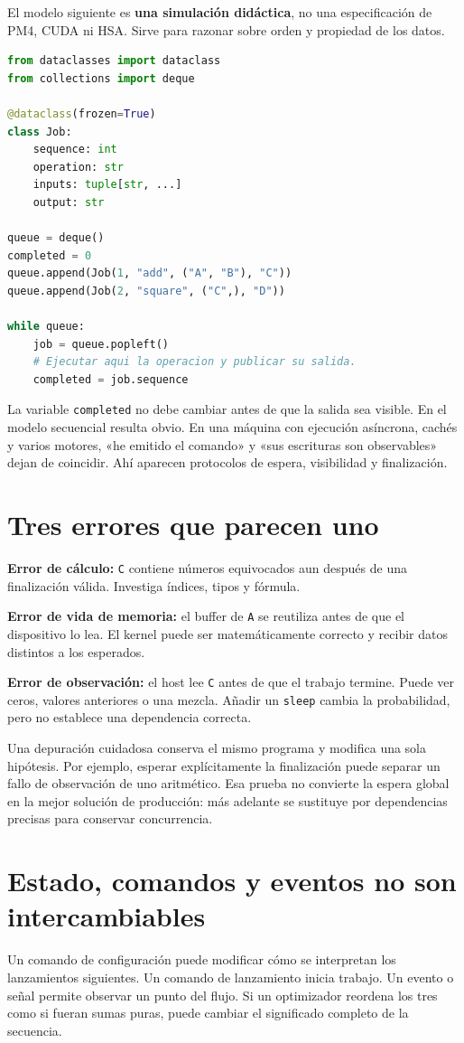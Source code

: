 \documentclass[12pt,a4paper,oneside]{report}
\begin{document}
El modelo siguiente es \textbf{una simulación didáctica}, no una especificación de PM4, CUDA ni HSA. Sirve para razonar sobre orden y propiedad de los datos.

\begin{lstlisting}[language=Python]
from dataclasses import dataclass
from collections import deque

@dataclass(frozen=True)
class Job:
    sequence: int
    operation: str
    inputs: tuple[str, ...]
    output: str

queue = deque()
completed = 0
queue.append(Job(1, "add", ("A", "B"), "C"))
queue.append(Job(2, "square", ("C",), "D"))

while queue:
    job = queue.popleft()
    # Ejecutar aqui la operacion y publicar su salida.
    completed = job.sequence
\end{lstlisting}
La variable \texttt{completed} no debe cambiar antes de que la salida sea visible. En el modelo secuencial resulta obvio. En una máquina con ejecución asíncrona, cachés y varios motores, «he emitido el comando» y «sus escrituras son observables» dejan de coincidir. Ahí aparecen protocolos de espera, visibilidad y finalización.

\section{Tres errores que parecen uno}
\textbf{Error de cálculo:} \texttt{C} contiene números equivocados aun después de una finalización válida. Investiga índices, tipos y fórmula.

\textbf{Error de vida de memoria:} el buffer de \texttt{A} se reutiliza antes de que el dispositivo lo lea. El kernel puede ser matemáticamente correcto y recibir datos distintos a los esperados.

\textbf{Error de observación:} el host lee \texttt{C} antes de que el trabajo termine. Puede ver ceros, valores anteriores o una mezcla. Añadir un \texttt{sleep} cambia la probabilidad, pero no establece una dependencia correcta.

Una depuración cuidadosa conserva el mismo programa y modifica una sola hipótesis. Por ejemplo, esperar explícitamente la finalización puede separar un fallo de observación de uno aritmético. Esa prueba no convierte la espera global en la mejor solución de producción: más adelante se sustituye por dependencias precisas para conservar concurrencia.

\section{Estado, comandos y eventos no son intercambiables}
Un comando de configuración puede modificar cómo se interpretan los lanzamientos siguientes. Un comando de lanzamiento inicia trabajo. Un evento o señal permite observar un punto del flujo. Si un optimizador reordena los tres como si fueran sumas puras, puede cambiar el significado completo de la secuencia.
\end{document}
